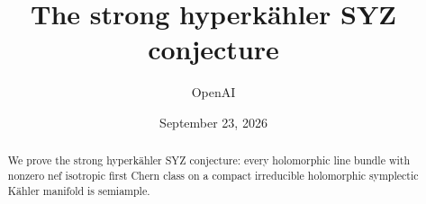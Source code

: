 \documentclass[11pt]{amsart}
\title[The strong hyperk\"ahler SYZ conjecture]{The strong hyperk\"ahler SYZ conjecture}
\author{OpenAI}
\date{September 23, 2026}
\begin{document}
\begin{abstract}
We prove the strong hyperk\"ahler SYZ conjecture: every holomorphic line
bundle with nonzero nef isotropic first Chern class on a compact
irreducible holomorphic symplectic K\"ahler manifold is semiample.
\end{abstract}
\maketitle
\tableofcontents






\enlargethispage{2\baselineskip}


\end{document}
